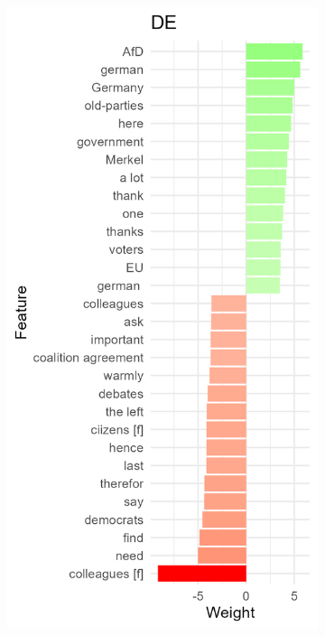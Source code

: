 \documentclass{article}
\begin{document}
\begin{figure}
     \centering
     \begin{subfigure}[b]{0.3\textwidth}
         \centering
         \includegraphics[width=\textwidth]{DE/vis/DE_weights.png}
     \end{subfigure}

\end{figure}
\end{document}
